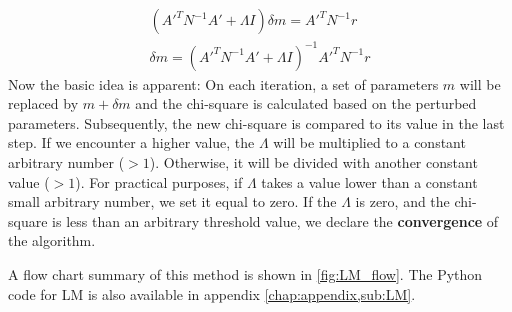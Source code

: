 \documentclass[12pt, TexShade, letterpaper]{report}
\begin{document}
\begin{gather}
    \left(A'^{T} N^{-1}A' + \Lambda I\right)\delta m = A'^T N^{-1} r\\
    \delta m = \left(A'^{T} N^{-1}A' + \Lambda I\right)^{-1} A'^T N^{-1} r \label{eq:LM}
\end{gather}
Now the basic idea is apparent: On each iteration, a set of parameters $m$ will be replaced by $m+\delta m$ and the chi-square is calculated based on the perturbed parameters. Subsequently, the new chi-square is compared to its value in the last step. If we encounter a higher value, the $\Lambda$ will be multiplied to a constant arbitrary number ($>1$). Otherwise, it will be divided with another constant value ($>1$). For practical purposes, if $\Lambda$ takes a value lower than a constant small arbitrary number, we set it equal to zero. If the $\Lambda$ is zero, and the chi-square is less than an arbitrary threshold value, we declare the \textbf{convergence} of the algorithm.\par
A flow chart summary of this method is shown in \ref{fig:LM_flow}. The Python code for LM is also available in appendix \ref{chap:appendix,sub:LM}.
\end{document}

